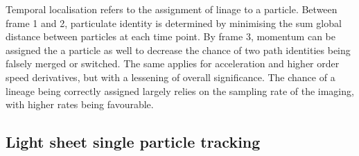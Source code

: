 Temporal localisation refers to the assignment of linage to a particle.
Between frame 1 and 2, particulate identity is determined by minimising the sum global distance between particles at each time point.
By frame 3, momentum can be assigned the a particle as well to decrease the chance of two path identities being falsely merged or switched.
The same applies for acceleration and higher order speed derivatives, but with a lessening of overall significance.
The chance of a lineage being correctly assigned largely relies on the sampling rate of the imaging, with higher rates being favourable.




\subsection{Light sheet single particle tracking}


